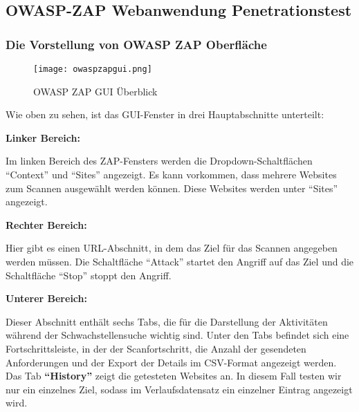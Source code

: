 \subsection{OWASP-ZAP Webanwendung Penetrationstest}

\subsubsection{Die Vorstellung von OWASP ZAP Oberfläche}

\newpage

\begin{figure}[h]
	\centering
	\texttt{[image: owaspzapgui.png]}
	\caption{OWASP ZAP GUI Überblick}
\end{figure}

Wie oben zu sehen, ist das GUI-Fenster in drei Hauptabschnitte unterteilt:\\

\begin{flushleft}
	\textbf{Linker Bereich:}\\
\end{flushleft}
Im linken Bereich des ZAP-Fensters werden die Dropdown-Schaltflächen "`Context"' und "`Sites"' angezeigt. Es kann vorkommen, dass mehrere Websites zum Scannen ausgewählt werden können. Diese Websites werden unter "`Sites"' angezeigt.

\begin{flushleft}
	\textbf{Rechter Bereich:}\\
\end{flushleft}
Hier gibt es einen URL-Abschnitt, in dem das Ziel für das Scannen angegeben werden müssen. Die Schaltfläche "`Attack"' startet den Angriff auf das Ziel und die Schaltfläche "`Stop"' stoppt den Angriff.

\begin{flushleft}
	\textbf{Unterer Bereich:}\\
\end{flushleft}
Dieser Abschnitt enthält sechs Tabs, die für die Darstellung der Aktivitäten während der Schwachstellensuche wichtig sind. Unter den Tabs befindet sich eine Fortschrittsleiste, in der der Scanfortschritt, die Anzahl der gesendeten Anforderungen und der Export der Details im CSV-Format angezeigt werden.\\

Das Tab \textbf{"`History"'} zeigt die getesteten Websites an. In diesem Fall testen wir nur ein einzelnes Ziel, sodass im Verlaufsdatensatz ein einzelner Eintrag angezeigt wird.\\


